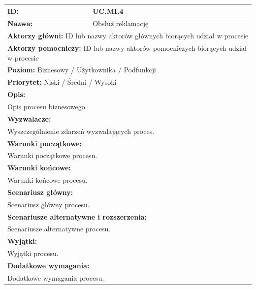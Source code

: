 \begin{center}
\begin{longtable}[h]{|p{1.6cm}|p{13.5cm}|}
\hline
\textbf{ID:} & UC.MI.4 \\ \hline
\textbf{Nazwa:} & Obsłuż reklamację \\ \hline
\multicolumn{2}{|p{15.1cm}|}{\textbf{Aktorzy główni:} ID lub nazwy aktorów głównych biorących udział w procesie} \\
\multicolumn{2}{|p{15.1cm}|}{\textbf{Aktorzy pomocniczy:} ID lub nazwy aktorów pomocniczych biorących udział w procesie} \\
\multicolumn{2}{|p{15.1cm}|}{\textbf{Poziom:}  Biznesowy / Użytkownika / Podfunkcji} \\
\multicolumn{2}{|p{15.1cm}|}{\textbf{Priorytet:}  Niski / Średni / Wysoki} \\
\hline
\multicolumn{2}{|p{15.1cm}|}{\textbf{Opis:}} \\
\multicolumn{2}{|p{15.1cm}|}{Opis procesu biznesowego.
} \\ \hline
\multicolumn{2}{|p{15.1cm}|}{\textbf{Wyzwalacze:}} \\
\multicolumn{2}{|p{15.1cm}|}{Wyszczególnienie zdarzeń wyzwalających proces.
} \\ \hline
\multicolumn{2}{|p{15.1cm}|}{\textbf{Warunki początkowe:}} \\
\multicolumn{2}{|p{15.1cm}|}{Warunki początkowe procesu.
} \\ \hline
\multicolumn{2}{|p{15.1cm}|}{\textbf{Warunki końcowe:}} \\
\multicolumn{2}{|p{15.1cm}|}{Warunki końcowe procesu.
} \\ \hline
\multicolumn{2}{|p{15.1cm}|}{\textbf{Scenariusz główny:}} \\
\multicolumn{2}{|p{15.1cm}|}{Scenariusz główny procesu.
} \\ \hline
\multicolumn{2}{|p{15.1cm}|}{\textbf{Scenariusze alternatywne i rozszerzenia:}} \\
\multicolumn{2}{|p{15.1cm}|}{Scenariusze alternatywne procesu.
} \\ \hline
\multicolumn{2}{|p{15.1cm}|}{\textbf{Wyjątki:}} \\
\multicolumn{2}{|p{15.1cm}|}{Wyjątki procesu.
} \\ \hline
\multicolumn{2}{|p{15.1cm}|}{\textbf{Dodatkowe wymagania:}} \\
\multicolumn{2}{|p{15.1cm}|}{Dodatkowe wymagania procesu.
} \\
\hline
\end{longtable}
\end{center}

